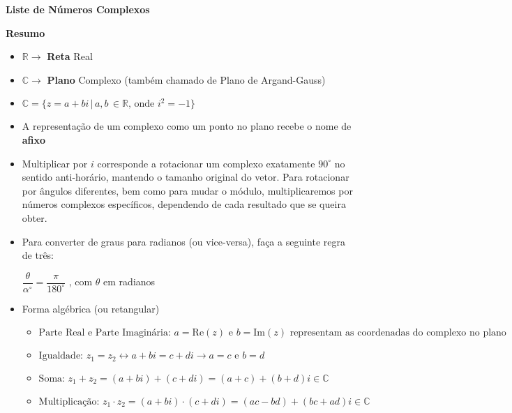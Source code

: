 \documentclass[a4paper, 12pt]{article}
\begin{document}
\begin{center}
\textbf{Liste de Números Complexos}
\end{center}

\textbf{Resumo}
\\


\begin{itemize}

\item $\mathbb{R} \longrightarrow$ \textbf{Reta} Real

\item $\mathbb{C} \longrightarrow$ \textbf{Plano} Complexo (também chamado de Plano de Argand-Gauss)

\item $ \mathbb{C} = \{ z = a + bi \, | \, a,b \, \in \mathbb{R} \textrm{, onde } i^2 = -1 \} $

\item A representação de um complexo como um ponto no plano recebe o nome de \textbf{afixo}

\item Multiplicar por $i$ corresponde a rotacionar um complexo exatamente $90^{\circ}$ no sentido anti-horário, mantendo o tamanho original do vetor. Para rotacionar por ângulos diferentes, bem como para mudar o módulo, multiplicaremos por números complexos específicos, dependendo de cada resultado que se queira obter.

\item Para converter de graus para radianos (ou vice-versa), faça a seguinte regra de três:

$\dfrac{\theta}{\alpha^{\circ}} = \dfrac{\pi}{180^{\circ}}$ , com $\theta$ em radianos

\item Forma algébrica (ou retangular)


	\begin{itemize}

\item $ \textrm{Parte Real e Parte Imagin\'aria: } a = \textrm{Re} (z) \textrm{ e } b = \textrm{Im} (z) \textrm{ representam as coordenadas do complexo no plano} $

\item $ \textrm{Igualdade: } z_1 = z_2 \longleftrightarrow a + bi = c + di \longrightarrow a = c \textrm{ e } b = d $

\item $ \textrm{Soma: } z_1 + z_2 = (a + bi) + (c + di) = (a + c) + (b + d)i \in \mathbb{C} $

\item $ \textrm{Multiplicação: } z_1 \cdot z_2 = (a + bi) \cdot (c + di) = (ac - bd) + (bc + ad)i \in \mathbb{C}$


\end{itemize}
\end{itemize}
\end{document}
